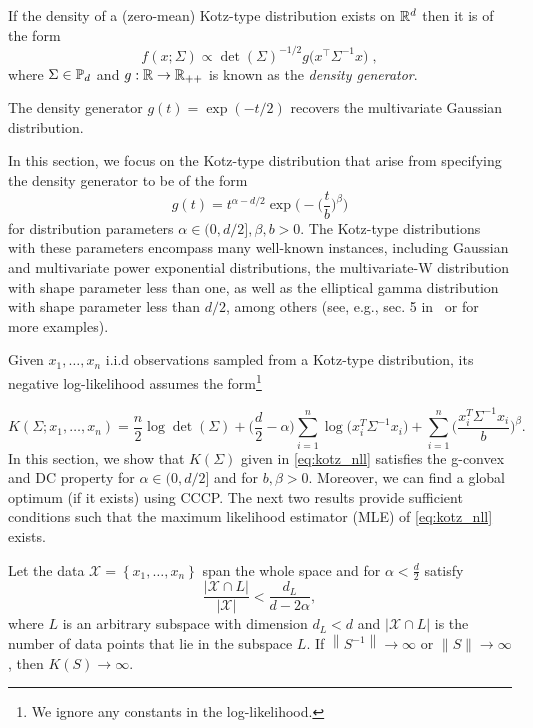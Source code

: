 \documentclass[sn-nature]{sn-jnl}%
\theoremstyle{thmstyleone}%
\theoremstyle{thmstyletwo}%
\theoremstyle{thmstylethree}%
\begin{document}
If the density of a (zero-mean) Kotz-type distribution exists on $\mathbb{R}^d$ then it is of the form 
\[
f(x;\Sigma) \propto \det (\Sigma)^{-1/2}g \big(x^\top \Sigma^{-1}x \big) \; ,
\]
where $\Sigma \in \mathbb{P}_d$ and $g: \mathbb{R} \to \mathbb{R}_{++}$ is known as the \textit{density generator}.

\begin{example}
    The density generator $g(t) = \exp(-t/2)$ recovers the multivariate Gaussian distribution. 
\end{example}
%
In this section, we focus on the Kotz-type distribution that arise from specifying the density generator to be of the form
\[
g(t) = t^{\alpha - d/2} \exp\Bigg(-\Big(\frac{t}{b} \Big)^\beta \Bigg)
\]
for distribution parameters $\alpha \in (0, d/2], \beta, b >0$. The Kotz-type distributions with these parameters encompass many well-known instances, including Gaussian and  multivariate power exponential distributions, the multivariate-W distribution with shape parameter less than one, as well as the elliptical gamma distribution with shape parameter less than $d/2$, among others (see, e.g., sec. 5 in~\cite{Sra_conic_geometric_Opt_SPD} or \cite{Fang2018} for more examples). 


Given $x_1, \ldots, x_n$ i.i.d observations sampled from a Kotz-type distribution, its negative log-likelihood assumes the form\footnote{We ignore any constants in the log-likelihood.} 

\begin{equation}\label{eq:kotz_nll}
    K(\Sigma; x_1, \ldots, x_n) = \frac{n}{2} \log \operatorname{det}(\Sigma)+\Big(\frac{d}{2}-\alpha\Big) \sum_{i=1}^n \log \big(x_i^T \Sigma^{-1} x_i\big)+\sum_{i=1}^n\Big(\frac{x_i^T \Sigma^{-1} x_i}{b}\Big)^\beta. 
\end{equation}
 In this section, we show that $K(\Sigma)$ given in \eqref{eq:kotz_nll} satisfies the g-convex and DC property for $\alpha \in (0, d/2]$ and for $b, \beta >0$. Moreover, we can find a global optimum (if it exists) using CCCP. The next two results provide sufficient conditions such that the maximum likelihood estimator (MLE) of \eqref{eq:kotz_nll} exists.

\begin{prop}\label{prop:kotz_existence_setting}
 Let the data $\mathcal{X}=\left\{x_1, \ldots, x_n\right\}$ span the whole space and for $\alpha<\frac{d}{2}$ satisfy
$$
\frac{|\mathcal{X} \cap L|}{|\mathcal{X}|}<\frac{d_L}{d-2 \alpha},
$$
where $L$ is an arbitrary subspace with dimension $d_L<d$ and $|\mathcal{X} \cap L|$ is the number of data points that lie in the subspace $L$. If $\left\|S^{-1}\right\| \rightarrow \infty$ or $\|S\| \rightarrow \infty$, then $K(S) \rightarrow \infty$.
\end{prop}
\end{document}
